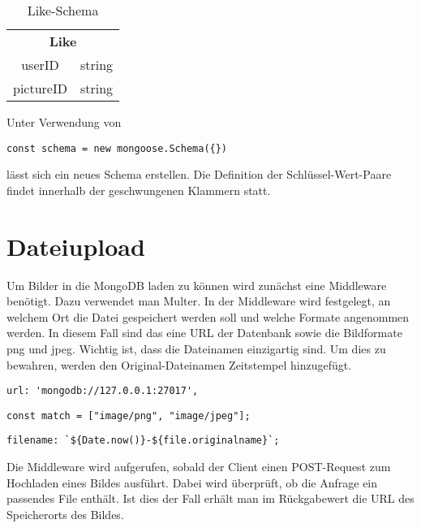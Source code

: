 \begin{table}[!htb]
\begin{tabularx}{\textwidth}{|c|c|}
    \cline{1-2}
    \multicolumn{2}{c}{\textbf{Like}}\\
    \cline{1-2}
    userID & string\\
    \cline{1-2}
    pictureID & string\\
    \cline{1-2}
\end{tabularx}
\caption{Like-Schema}
\label{likeschema}
\end{table}

Unter Verwendung von 

\begin{lstlisting}[caption=Erstellen eines neuen Schemas, label=lst:schema]
    const schema = new mongoose.Schema({})
\end{lstlisting}

lässt sich ein neues Schema erstellen. Die Definition der Schlüssel-Wert-Paare findet innerhalb der geschwungenen Klammern statt.

\section{Dateiupload}
Um Bilder in die MongoDB laden zu können wird zunächst eine Middleware benötigt. Dazu verwendet man Multer. In der Middleware wird festgelegt, an welchem Ort die Datei gespeichert werden soll und welche Formate angenommen werden. In diesem Fall sind das eine URL der Datenbank sowie die Bildformate png und jpeg. Wichtig ist, dass die Dateinamen einzigartig sind. Um dies zu bewahren, werden den Original-Dateinamen Zeitstempel hinzugefügt.

\begin{lstlisting}[caption=Zuweisen der URL der Datenbank, label=lst:url]
    url: 'mongodb://127.0.0.1:27017',
\end{lstlisting}

\begin{lstlisting}[caption=Festlegen der zugelassenen Dateiformate, label=lst:dateiformate]
    const match = ["image/png", "image/jpeg"];
\end{lstlisting}

\begin{lstlisting}[caption=Festlegen des Dateinamens mit Zeitstempel, label=lst:dateiname]
    filename: `${Date.now()}-${file.originalname}`;
\end{lstlisting}

Die Middleware wird aufgerufen, sobald der Client einen POST-Request zum Hochladen eines Bildes ausführt. Dabei wird überprüft, ob die Anfrage ein passendes File enthält. Ist dies der Fall erhält man im Rückgabewert die URL des Speicherorts des Bildes.

